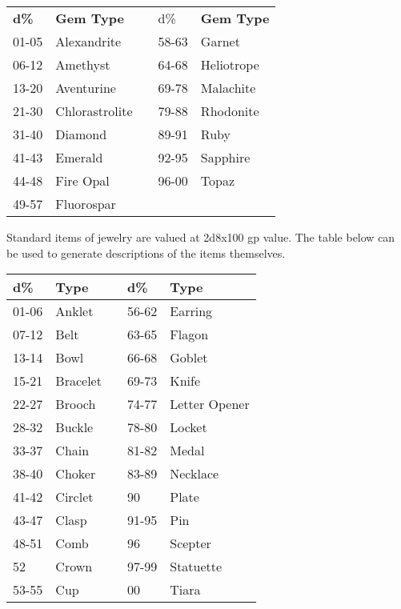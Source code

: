 \documentclass[a4paper,twoside,openany,10pt]{book}
\begin{document}
\begin{multicols}{2}
\begin{tabular*}{0.93\linewidth}{@{\extracolsep{\fill}}lllll}
\textbf{d\%} & \textbf{Gem Type} & & d\% & \textbf{Gem Type} \\
01-05 & Alexandrite & & 58-63 & Garnet \\\toprule
06-12 & Amethyst & & 64-68 & Heliotrope \\\hline
13-20 & Aventurine & & 69-78 & Malachite \\\hline
21-30 & Chlorastrolite & & 79-88 & Rhodonite \\\hline
31-40 & Diamond & & 89-91 & Ruby \\\hline
41-43 & Emerald & & 92-95 & Sapphire \\\hline
44-48 & Fire Opal & & 96-00 & Topaz \\\hline
49-57 & Fluorospar & & & \\\bottomrule
\end{tabular*}\medskip

Standard items of jewelry are valued at 2d8x100 gp value. The table below can be used to generate descriptions of the items themselves.\medskip

\begin{tabular*}{0.93\linewidth}{@{\extracolsep{\fill}}lllll}
\textbf{d\%} & \textbf{Type} & &\textbf{ d\%} & \textbf{Type} \\\toprule
01-06 & Anklet & & 56-62 & Earring \\\hline
07-12 & Belt & & 63-65 & Flagon \\\hline
13-14 & Bowl & & 66-68 & Goblet \\\hline
15-21 & Bracelet & & 69-73 & Knife \\\hline
22-27 & Brooch & & 74-77 & Letter Opener \\\hline
28-32 & Buckle & & 78-80 & Locket \\\hline
33-37 & Chain & & 81-82 & Medal \\\hline
38-40 & Choker & & 83-89 & Necklace \\\hline
41-42 & Circlet & & 90 & Plate \\\hline
43-47 & Clasp & & 91-95 & Pin \\\hline
48-51 & Comb & & 96 & Scepter \\\hline
52 & Crown & & 97-99 & Statuette \\\hline
53-55 & Cup & & 00 & Tiara \\\bottomrule
\end{tabular*}

\end{multicols}
\end{document}
